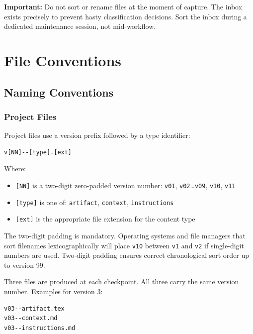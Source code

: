 \documentclass[12pt,letterpaper]{article}
\begin{document}
\begin{mdframed}[style=warnbox]
\textbf{Important:} Do not sort or rename files at the moment of capture.
The inbox exists precisely to prevent hasty classification decisions.
Sort the inbox during a dedicated maintenance session, not mid-workflow.
\end{mdframed}

\section{File Conventions}

\subsection{Naming Conventions}

\subsubsection{Project Files}

Project files use a version prefix followed by a type identifier:

\begin{lstlisting}
v[NN]--[type].[ext]
\end{lstlisting}

Where:
\begin{itemize}
  \item \texttt{[NN]} is a two-digit zero-padded version number:
        \texttt{v01}, \texttt{v02}\ldots\texttt{v09}, \texttt{v10}, \texttt{v11}
  \item \texttt{[type]} is one of: \texttt{artifact}, \texttt{context},
        \texttt{instructions}
  \item \texttt{[ext]} is the appropriate file extension for the content type
\end{itemize}

The two-digit padding is mandatory. Operating systems and file managers that
sort filenames lexicographically will place \texttt{v10} between \texttt{v1}
and \texttt{v2} if single-digit numbers are used. Two-digit padding ensures
correct chronological sort order up to version 99.

Three files are produced at each checkpoint. All three carry the same version
number. Examples for version 3:

\begin{lstlisting}
v03--artifact.tex
v03--context.md
v03--instructions.md
\end{lstlisting}
\end{document}
